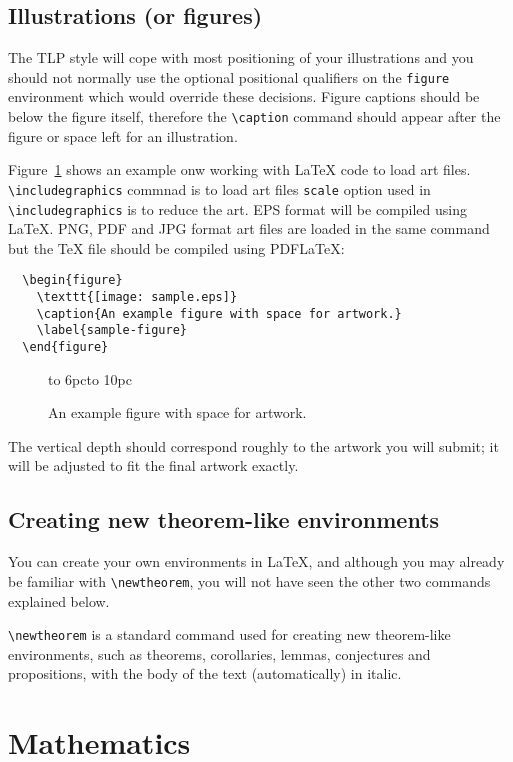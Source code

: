\documentclass{tlp}
\begin{document}
\subsection{Illustrations (or figures)}

The TLP style will cope with most positioning of your illustrations
and you should not normally use the optional positional qualifiers on
the \verb"figure" environment which would override these decisions.
Figure captions should be below the figure itself, therefore the \verb"\caption"
command should appear after the figure or space left for an illustration.

Figure~\ref{sample-figure} shows an example onw working with LaTeX code to load art files. \verb"\includegraphics" commnad is to load art files \verb"scale" option used in \verb"\includegraphics" is to reduce the art. EPS format will be compiled using LaTeX. PNG, PDF and JPG format art files are loaded in the same command but the TeX file should be compiled using PDFLaTeX:
%
\begin{verbatim}
  \begin{figure}
    \texttt{[image: sample.eps]}
    \caption{An example figure with space for artwork.}
    \label{sample-figure}
  \end{figure}
\end{verbatim}
%
\begin{figure}[t]
  \centerline{\vbox to 6pc{\hbox to 10pc{}}}
  \caption{An example figure with space for artwork.}
  \label{sample-figure}
\end{figure}
%
The vertical depth should correspond roughly to the artwork you will submit;
it will be adjusted to fit the final artwork exactly.

\subsection{Creating new theorem-like environments}

You can create your own environments in \LaTeX, and although you may already
be familiar with \verb"\newtheorem", you will not have seen the other two
commands explained below.

\verb"\newtheorem" is a standard command used for creating new
        theorem-like environments, such as theorems, corollaries, lemmas,
        conjectures and propositions, with the body of the text
        (automatically) in italic.

\section{Mathematics}
\end{document}
